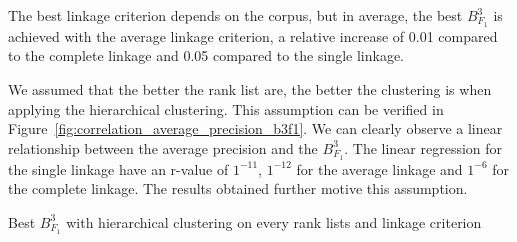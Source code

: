 The best linkage criterion depends on the corpus, but in average, the best $B^3_{F_1}$ is achieved with the average linkage criterion, a relative increase of 0.01 compared to the complete linkage and 0.05 compared to the single linkage.

We assumed that the better the rank list are, the better the clustering is when applying the hierarchical clustering.
This assumption can be verified in Figure~\ref{fig:correlation_average_precision_b3f1}.
We can clearly observe a linear relationship between the average precision and the $B^3_{F_1}$.
The linear regression for the single linkage have an r-value of $1^{-11}$, $1^{-12}$ for the average linkage and $1^{-6}$ for the complete linkage.
The results obtained further motive this assumption.

\begin{table}
  \centering
  \caption{Best $B^3_{F_1}$ with hierarchical clustering on every rank lists and linkage criterion}
  \label{tab:hierarchical_clustering}


\end{table}
